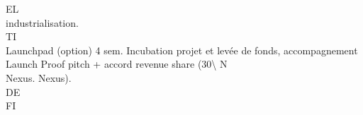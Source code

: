 EL\\
industrialisation.\\
\vspace{0.5em}
\vspace{0.5em}
\vspace{0.5em}
\vspace{0.5em}
TI\\
Launchpad (option)   4 sem.    Incubation projet et levée de fonds, accompagnement       Launch Proof pitch + accord revenue share (30\textbackslash{}%
\vspace{0.5em}
\vspace{0.5em}
\vspace{0.5em}
\vspace{0.5em}
N\\
Nexus.                                                    Nexus).\\
\vspace{0.5em}
\vspace{0.5em}
\vspace{0.5em}
\vspace{0.5em}
DE\\
FI\\
